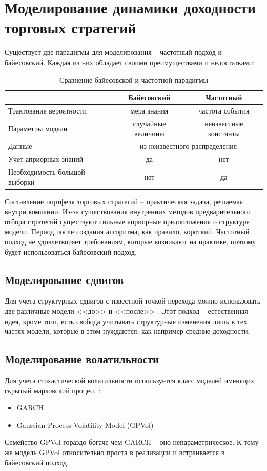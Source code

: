 \chapter{Моделирование динамики доходности торговых стратегий}
Существует две парадигмы для моделирования -- частотный подход и байесовский. Каждая из них обладает своими преимуществами и недостатками:
\begin{table}[h]
\centering
\caption{Сравнение байесовской и частотной парадигмы}
	\begin{tabular}{l|c|c}
	& Байесовский  & Частотный \\ \hline
	Трактование вероятности & мера знания & частота события \\ \hline
	Параметры модели & случайные величины & неизвестные константы \\ \hline
	Данные & \multicolumn{2}{c}{из неизвестного распределения}  \\ \hline
	Учет априорных знаний & да & нет \\ \hline
	Необходимость большой выборки & нет & да
 	\end{tabular}
\end{table}
Составление портфеля торговых стратегий -- практическая задача, решаемая внутри компании. Из-за существования внутренних методов предварительного отбора стратегий существуют сильные априорные предположения о структуре модели. Период после создания алгоритма, как правило, короткий. Частотный подход не удовлетворяет требованиям, которые возникают на практике, поэтому будет использоваться байесовский подход.
\section{Моделирование сдвигов}
Для учета структурных сдвигов с известной точкой перехода можно использовать две различные модели <<до>> и <<после>> \citep{salazar1982}. Этот подход -- естественная идея, кроме того, есть свобода учитывать структурные изменения лишь в тех частях модели, которые в этом нуждаются, как например средние доходности.

\section{Моделирование волатильности}
Для учета стохастической волатильности используется класс моделей имеющих скрытый марковский процесс \citep{ghahramani2001}:
\begin{itemize}
	\item GARCH \citep{engle1982}
	\item Gaussian Process Volatility Model (GPVol) \citep{han2016}
\end{itemize}
Семейство GPVol гораздо богаче чем GARCH -- оно непараметрическое. К тому же модель GPVol относительно проста в реализации и встраивается в байесовский подход.


